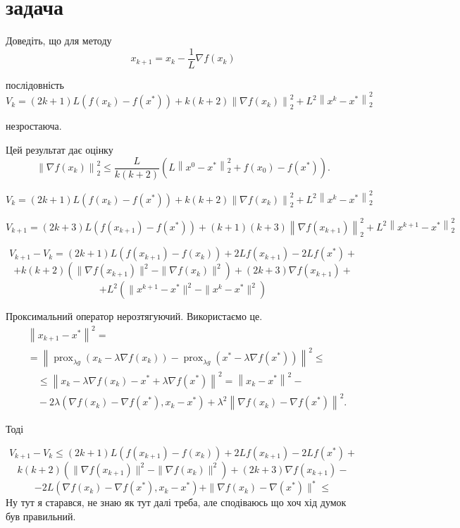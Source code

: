 
\section{задача}

\begin{tcolorbox}[title=Умова]
    Доведіть, що для методу
    $$
    x_{k+1}=x_k-\frac{1}{L} \nabla f\left(x_k\right)
    $$

    послідовність
    $$
    V_k=(2 k+1) L\left(f\left(x_k\right)-f\left(x^*\right)\right)+k(k+2)\left\|\nabla f\left(x_k\right)\right\|_2^2+L^2\left\|x^k-x^*\right\|_2^2
    $$

    незростаюча.

    Цей результат дає оцінку
    $$
    \left\|\nabla f\left(x_k\right)\right\|_2^2 \leq \frac{L}{k(k+2)}\left(L\left\|x^0-x^*\right\|_2^2+f\left(x_0\right)-f\left(x^*\right)\right) .
    $$
\end{tcolorbox}


$$
V_k=(2 k+1) L\left(f\left(x_k\right)-f\left(x^*\right)\right)+k(k+2)\left\|\nabla f\left(x_k\right)\right\|_2^2+L^2\left\|x^k-x^*\right\|_2^2
$$

$$
V_{k+1}=(2 k+3) L\left(f\left(x_{k+1}\right)-f\left(x^*\right)\right)+(k + 1)(k+3)\left\|\nabla f\left(x_{k+1}\right)\right\|_2^2+L^2\left\|x^{k+1}-x^*\right\|_2^2
$$

$$
V_{k+1} - V_{k} = (2k+1)L(f(x_{k+1}) - f(x_k)) + 2Lf(x_{k+1}) - 2Lf(x^*) +$$ 
$$+k(k+2)(\|\nabla f(x_{k+1})\|^2 -  \|\nabla f(x_k)\|^2) + (2k + 3)\nabla f(x_{k+1}) + $$
$$+L^2(\|x^{k+1} - x^*\|^2 - \|x^k - x^*\|^2)
$$


Проксимальний оператор нерозтягуючий. Використаємо це.
$$
\begin{aligned}
& \left\|x_{k+1}-x^*\right\|^2= \\
& =\left\|\operatorname{prox}_{\lambda g}\left(x_k-\lambda \nabla f\left(x_k\right)\right)-\operatorname{prox}_{\lambda g}\left(x^*-\lambda \nabla f\left(x^*\right)\right)\right\|^2 \leq \\
& \quad \leq\left\|x_k-\lambda \nabla f\left(x_k\right)-x^*+\lambda \nabla f\left(x^*\right)\right\|^2=\left\|x_k-x^*\right\|^2- \\
& \quad-2 \lambda\left(\nabla f\left(x_k\right)-\nabla f\left(x^*\right), x_k-x^*\right)+\lambda^2\left\|\nabla f\left(x_k\right)-\nabla f\left(x^*\right)\right\|^2 .
\end{aligned}
$$

\pagebreak

Тоді 

$$
V_{k+1} - V_{k} \le  (2k+1)L(f(x_{k+1}) - f(x_k)) + 2Lf(x_{k+1}) - 2Lf(x^*) +
$$
$$
k(k+2)(\|\nabla f(x_{k+1})\|^2 -  \|\nabla f(x_k)\|^2) + (2k + 3)\nabla f(x_{k+1}) -
$$
$$
-2L(\nabla f(x_k) - \nabla f(x^*), x_k - x^*) + \|\nabla f(x_k) - \nabla(x^*)\|^* \le
$$
Ну тут я старався, не знаю як тут далі треба, але сподіваюсь що хоч хід думок був 
правильний.
